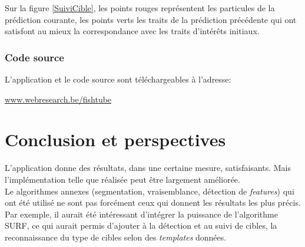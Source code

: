 \documentclass[a4paper,11pt]{report}
\begin{document}
Sur la figure \ref{SuiviCible}, les points rouges représentent les particules de la prédiction courante, les points verts les traits de la prédiction précédente qui ont satisfont au mieux la correspondance avec les traits d'intérêts initiaux.\\

\subsection{Code source}

L'application et le code source sont téléchargeables à l'adresse:
 \begin{center}
 \url{www.webresearch.be/fishtube}
 \end{center}   


\chapter{Conclusion et perspectives}

L'application donne des résultats, dans une certaine mesure, satisfaisants. Mais l'implémentation telle que réalisée peut être largement améliorée.\\

Le algorithmes annexes (segmentation, vraisemblance, détection de \textit{features}) qui ont été utilisé ne sont pas forcément ceux qui donnent les résultats les plus précis.\\ 

Par exemple, il aurait été intéressant d'intégrer la puissance de l'algorithme SURF, ce qui aurait permis d'ajouter à la détection et au suivi de cibles, la reconnaissance du type de cibles selon des \textit{templates} données.


\nocite{*}

\listoffigures
\end{document}
